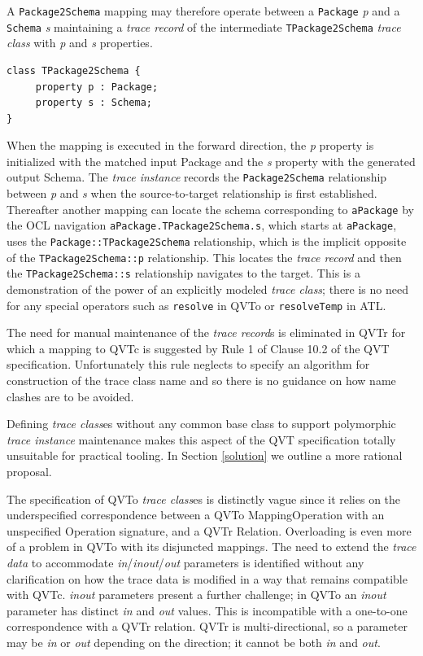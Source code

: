 \documentclass[runningheads,a4paper]{llncs}
\begin{document}
A \verb|Package2Schema| mapping may therefore operate between a \verb|Package| \emph{p} and a \verb|Schema| \emph{s} maintaining a \emph{trace record} of the intermediate \verb|TPackage2Schema| \emph{trace class} with \emph{p} and \emph{s} properties.
 
\begin{verbatim}
class TPackage2Schema {
     property p : Package;
     property s : Schema;
}
\end{verbatim}

When the mapping is executed in the forward direction, the \emph{p} property is initialized with the matched input Package and the \emph{s} property with the generated output Schema. The \emph{trace instance} records the \verb|Package2Schema| relationship between \emph{p} and \emph{s} when the source-to-target relationship is first established. Thereafter another mapping can locate the schema corresponding to \verb|aPackage| by the OCL navigation \verb|aPackage.TPackage2Schema.s|, which starts at \verb|aPackage|, uses the \verb|Package::TPackage2Schema| relationship, which is the implicit opposite of the \verb|TPackage2Schema::p| relationship. This locates the \emph{trace record} and then the \verb|TPackage2Schema::s| relationship navigates to the target. This is a demonstration of the power of an explicitly modeled \emph{trace class}; there is no need for any special operators such as \verb|resolve| in QVTo or \verb|resolveTemp| in ATL.

The need for manual maintenance of the \emph{trace record}s is eliminated in QVTr for which a mapping to QVTc is suggested by Rule 1 of Clause 10.2 of the QVT specification. Unfortunately this rule neglects to specify an algorithm for construction of the trace class name and so there is no guidance on how name clashes are to be avoided.

Defining \emph{trace class}es without any common base class to support polymorphic \emph{trace instance} maintenance makes this aspect of the QVT specification totally unsuitable for practical tooling. In Section \ref{solution} we outline a more rational proposal.

The specification of QVTo \emph{trace class}es is distinctly vague since it relies on the underspecified correspondence between a QVTo MappingOperation with an unspecified Operation signature, and a QVTr Relation. Overloading is even more of a problem in QVTo with its disjuncted mappings. The need to extend the \emph{trace data} to accommodate \emph{in}/\emph{inout}/\emph{out} parameters is identified without any clarification on how the trace data is modified in a way that remains compatible with QVTc. \emph{inout} parameters present a further challenge; in QVTo an \emph{inout} parameter has distinct \emph{in} and \emph{out} values. This is incompatible with a one-to-one correspondence with a QVTr relation. QVTr is multi-directional, so a parameter may be \emph{in} or \emph{out} depending on the direction; it cannot be both \emph{in} and \emph{out}.
\end{document}
